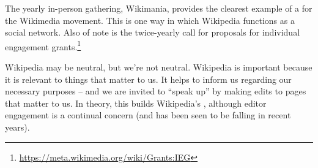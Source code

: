  
The yearly in-person gathering, Wikimania, provides the clearest
example of a  for the Wikimedia movement.  This
is one way in which Wikipedia functions as a social network.  Also of
note is the twice-yearly call for proposals for individual engagement
grants.\footnote{\url{https://meta.wikimedia.org/wiki/Grants:IEG}}

%
%
Wikipedia may be neutral, but we're not neutral.
%
%
%
Wikipedia is important because it is relevant to things that matter to
us.  It helps to inform us regarding our necessary purposes -- and we
are invited to ``speak up'' by making edits to pages that matter to
us.  In theory, this builds Wikipedia's , although editor engagement is a continual concern (and
has been seen to be falling in recent years).
%



